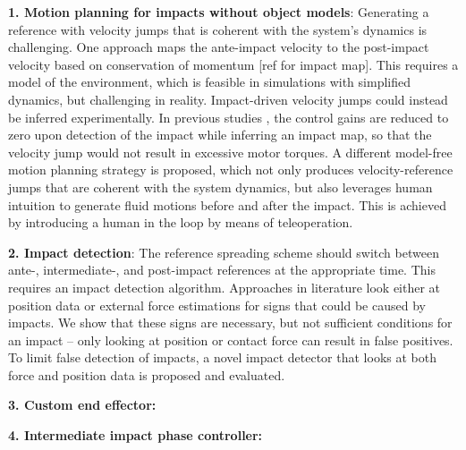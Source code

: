 \documentclass[a4paper, 10pt, conference]{ieeeconf}
\begin{document}
    \textbf{1. Motion planning for impacts without object models}: Generating a reference with velocity jumps that is coherent with the system’s dynamics is challenging. 
    One approach maps the ante-impact velocity to the post-impact velocity based on conservation of momentum [ref for impact map]. This requires a model of the environment, which is feasible in simulations with simplified dynamics, but challenging in reality.
    Impact-driven velocity jumps could instead be inferred experimentally. In previous studies \cite{aouajPredictingPostImpactVelocity2021}, the control gains are reduced to zero upon detection of the impact while inferring an impact map, so that the velocity jump would not result in excessive motor torques.
    A different model-free motion planning strategy is proposed, which not only produces velocity-reference jumps that are coherent with the system dynamics, but also leverages human intuition to generate fluid motions before and after the impact. This is achieved by introducing a human in the loop by means of teleoperation. %

    \textbf{2. Impact detection}: The reference spreading scheme should switch between ante-, intermediate-, and post-impact references at the appropriate time. This requires an impact detection algorithm. Approaches in literature look either at position data \cite{rijnenMotionSignalsVelocity2018} or external force estimations \cite{uitendaalTeachingRobotsInteraction2022,properAimAwareCollisionMonitoring2021,properValidationNumericalSimultaneous2022} for signs that could be caused by impacts. We show that these signs are necessary, but not sufficient conditions for an impact -- only looking at position or contact force can result in false positives. To limit false detection of impacts, a novel impact detector that looks at both force and position data is proposed and evaluated.

    \textbf{3. Custom end effector:}

    \textbf{4. Intermediate impact phase controller:}

\end{document}
